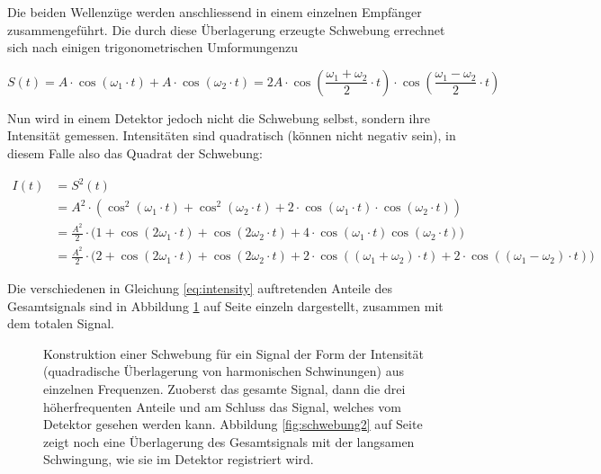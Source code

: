 Die beiden  Wellenz\"uge werden  anschliessend in einem  einzelnen Empf\"anger
zusammengef\"uhrt. Die durch diese \"Uberlagerung erzeugte Schwebung errechnet
sich  nach  einigen  trigonometrischen  Umformungen\footnotemark[1] zu


\begin{equation}
    \label{eq:schwebung}
    S(t) = A \cdot \cos(\omega_1 \cdot t) + A \cdot \cos(\omega_2 \cdot t)
         = 2 A \cdot
             \cos\left(
                 \frac{\omega_1 + \omega_2}{2} \cdot t
             \right)
             \cdot
             \cos\left(
                 \frac{\omega_1 - \omega_2}{2} \cdot t
             \right)
\end{equation}

Nun wird  in einem Detektor  jedoch nicht  die Schwebung selbst,  sondern ihre
Intensit\"at gemessen. Intensit\"aten sind quadratisch (k\"onnen nicht negativ
sein), in diesem Falle also das Quadrat der Schwebung:

\begin{equation}
    \label{eq:intensity}
    \begin{split}
        I(t) &= S^2(t) \\
             &= A^2           \cdot \left( \cos^2(\omega_1 \cdot t) + \cos^2(\omega_2 \cdot t) + 2 \cdot \cos(\omega_1 \cdot t) \cdot \cos(\omega_2 \cdot t) \right) \\
             &= \frac{A^2}{2} \cdot \Big( 1 + \cos(2\omega_1 \cdot t) + \cos(2\omega_2 \cdot t) + 4 \cdot \cos(\omega_1 \cdot t)\cos(\omega_2 \cdot t) \Big) \\
             &= \frac{A^2}{2} \cdot \Big( 2 + \cos(2\omega_1 \cdot t) + \cos(2\omega_2 \cdot t) + 2 \cdot \cos\left((\omega_1 + \omega_2) \cdot t \right) + 2 \cdot \cos\left( (\omega_1 - \omega_2) \cdot t \right) \Big)
    \end{split}
\end{equation}

Die  verschiedenen   in  Gleichung  \ref{eq:intensity}   auftretenden  Anteile
des   Gesamtsignals   sind   in  Abbildung   \ref{fig:schwebung}   auf   Seite
\pageref{fig:schwebung} einzeln dargestellt, zusammen mit dem totalen Signal.

\begin{figure}[h!t]
    \centering
    \resizebox{0.75\textwidth}{!}{}
    \caption{%
        Konstruktion   einer    Schwebung   f\"ur   ein   Signal    der   Form
        der   Intensit\"at  (quadradische   \"Uberlagerung  von   harmonischen
        Schwinungen)   aus   einzelnen    Frequenzen. Zuoberst   das   gesamte
        Signal,  dann  die  drei  h\"oherfrequenten  Anteile  und  am  Schluss
        das  Signal,  welches  vom  Detektor  gesehen  werden  kann. Abbildung
        \ref{fig:schwebung2}  auf  Seite \pageref{fig:schwebung2}  zeigt  noch
        eine \"Uberlagerung  des Gesamtsignals  mit der  langsamen Schwingung,
        wie sie im Detektor registriert wird.
    }
    \label{fig:schwebung}
\end{figure}

